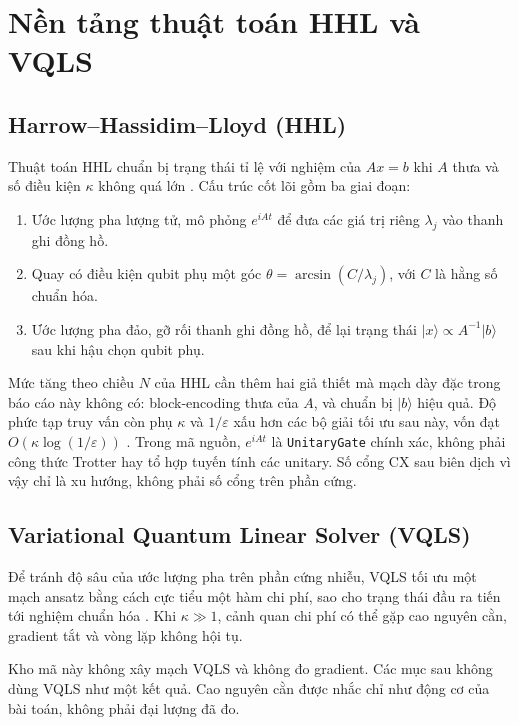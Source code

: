 \documentclass[11pt,a4paper]{article}
\newenvironment{revisedblock}{\par\color{revised}\ignorespaces}{\par}
\begin{document}
\section{Nền tảng thuật toán HHL và VQLS}

\subsection{Harrow--Hassidim--Lloyd (HHL)}
Thuật toán HHL chuẩn bị trạng thái tỉ lệ với nghiệm của \(Ax=b\) khi \(A\) thưa và số điều kiện \(\kappa\) không quá lớn \citep{harrow2009}.
Cấu trúc cốt lõi gồm ba giai đoạn:
\begin{enumerate}
  \item Ước lượng pha lượng tử, mô phỏng \(e^{iAt}\) để đưa các giá trị riêng \(\lambda_j\) vào thanh ghi đồng hồ.
  \item Quay có điều kiện qubit phụ một góc \(\theta=\arcsin(C/\lambda_j)\), với \(C\) là hằng số chuẩn hóa.
  \item Ước lượng pha đảo, gỡ rối thanh ghi đồng hồ, để lại trạng thái \(\lvert x\rangle\propto A^{-1}\lvert b\rangle\) sau khi hậu chọn qubit phụ.
\end{enumerate}

\begin{revisedblock}
Mức tăng theo chiều \(N\) của HHL cần thêm hai giả thiết mà mạch dày đặc trong báo cáo này không có: block-encoding thưa của \(A\), và chuẩn bị \(\lvert b\rangle\) hiệu quả.
Độ phức tạp truy vấn còn phụ \(\kappa\) và \(1/\varepsilon\) xấu hơn các bộ giải tối ưu sau này, vốn đạt \(O(\kappa\log(1/\varepsilon))\) \citep{costa2022,dalzell2024}.
Trong mã nguồn, \(e^{iAt}\) là \texttt{UnitaryGate} chính xác, không phải công thức Trotter hay tổ hợp tuyến tính các unitary.
Số cổng CX sau biên dịch vì vậy chỉ là xu hướng, không phải số cổng trên phần cứng.
\end{revisedblock}

\subsection{Variational Quantum Linear Solver (VQLS)}
Để tránh độ sâu của ước lượng pha trên phần cứng nhiễu, VQLS tối ưu một mạch ansatz bằng cách cực tiểu một hàm chi phí, sao cho trạng thái đầu ra tiến tới nghiệm chuẩn hóa \citep{bravoprieto2023}.
Khi \(\kappa\gg 1\), cảnh quan chi phí có thể gặp cao nguyên cằn, gradient tắt và vòng lặp không hội tụ.

\begin{revisedblock}
Kho mã này không xây mạch VQLS và không đo gradient.
Các mục sau không dùng VQLS như một kết quả.
Cao nguyên cằn được nhắc chỉ như động cơ của bài toán, không phải đại lượng đã đo.
\end{revisedblock}
\end{document}
